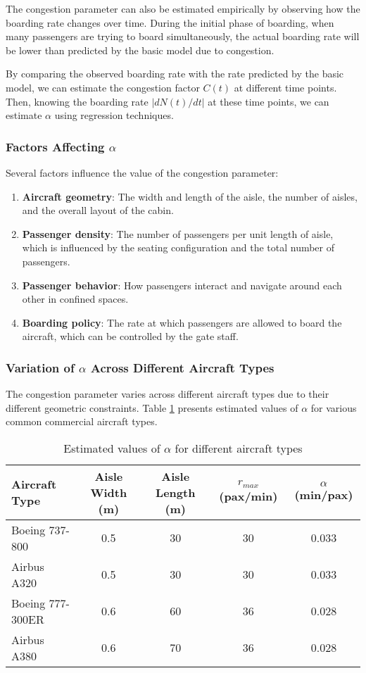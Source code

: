\documentclass[12pt,a4paper]{article}
\begin{document}
The congestion parameter can also be estimated empirically by observing how the boarding rate changes over time. During the initial phase of boarding, when many passengers are trying to board simultaneously, the actual boarding rate will be lower than predicted by the basic model due to congestion.

By comparing the observed boarding rate with the rate predicted by the basic model, we can estimate the congestion factor $C(t)$ at different time points. Then, knowing the boarding rate $|dN(t)/dt|$ at these time points, we can estimate $\alpha$ using regression techniques.

\subsubsection{Factors Affecting $\alpha$}

Several factors influence the value of the congestion parameter:

\begin{enumerate}
    \item \textbf{Aircraft geometry}: The width and length of the aisle, the number of aisles, and the overall layout of the cabin.
    \item \textbf{Passenger density}: The number of passengers per unit length of aisle, which is influenced by the seating configuration and the total number of passengers.
    \item \textbf{Passenger behavior}: How passengers interact and navigate around each other in confined spaces.
    \item \textbf{Boarding policy}: The rate at which passengers are allowed to board the aircraft, which can be controlled by the gate staff.
\end{enumerate}

\subsubsection{Variation of $\alpha$ Across Different Aircraft Types}

The congestion parameter varies across different aircraft types due to their different geometric constraints. Table \ref{tab:alpha_values} presents estimated values of $\alpha$ for various common commercial aircraft types.

\begin{table}[H]
\centering
\begin{tabular}{|l|c|c|c|c|}
\hline
\textbf{Aircraft Type} & \textbf{Aisle Width (m)} & \textbf{Aisle Length (m)} & \textbf{$r_{max}$ (pax/min)} & \textbf{$\alpha$ (min/pax)} \\ \hline
Boeing 737-800 & 0.5 & 30 & 30 & 0.033 \\ \hline
Airbus A320 & 0.5 & 30 & 30 & 0.033 \\ \hline
Boeing 777-300ER & 0.6 & 60 & 36 & 0.028 \\ \hline
Airbus A380 & 0.6 & 70 & 36 & 0.028 \\ \hline
\end{tabular}
\caption{Estimated values of $\alpha$ for different aircraft types}
\label{tab:alpha_values}
\end{table}
\end{document}
